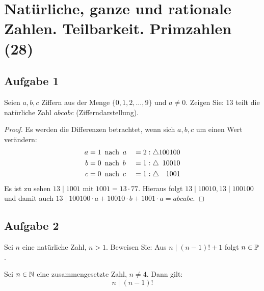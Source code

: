 \section{Natürliche, ganze und rationale Zahlen. Teilbarkeit. Primzahlen (28)}

\subsection{Aufgabe 1}
Seien $a,b,c$ Ziffern aus der Menge $\{0,1,2,\dotsc,9\}$ und $a \neq 0$.
Zeigen Sie: 13 teilt die natürliche Zahl $abcabc$ (Zifferndarstellung).
\begin{proof}
  Es werden die Differenzen betrachtet, wenn sich $a, b, c$ um einen Wert verändern:
  \begin{alignat*}{2}
    a & = 1 \enspace\text{nach}\enspace a &  & = 2 : \triangle 100100            \\
    b & = 0 \enspace\text{nach}\enspace b &  & = 1 : \triangle \hphantom{0}10010 \\
    c & = 0 \enspace\text{nach}\enspace c &  & = 1 : \triangle \hphantom{00}1001
  \end{alignat*}
  Es ist zu sehen $13 \mid 1001$ mit $1001 = 13 \cdot 77$.
  Hieraus folgt $13 \mid 10010, 13 \mid 100100$ und damit auch
  $13 \mid 100100 \cdot a + 10010 \cdot b + 1001 \cdot a = abcabc$.
\end{proof}

\subsection{Aufgabe 2}
Sei $n$ eine natürliche Zahl, $n > 1$. Beweisen Sie: Aus $n \mid (n - 1)! + 1$
folgt $n \in \mathbb{P}$.

\begin{lemma}
  \label{lemma:n_neq4_composite}
  Sei $n \in \mathbb{N}$ eine zusammengesetzte Zahl, $n \neq 4$. Dann gilt:
  \begin{equation*}
    n \mid (n - 1)!
  \end{equation*}
\end{lemma}

